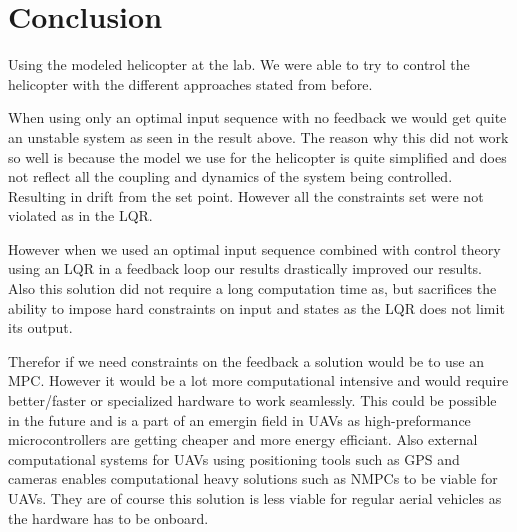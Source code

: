 \section{Conclusion}\label{sec:conclusion}

Using the modeled helicopter at the lab. We were able to try to control the helicopter with the different approaches stated from before.

When using only an optimal input sequence with no feedback we would get quite an unstable system as seen in the result above. The reason why this did not work so well is because the model we use for the helicopter is quite simplified and does not reflect all the coupling and dynamics of the system being controlled. Resulting in drift from the set point. However all the constraints set were not violated as in the LQR.

However when we used an optimal input sequence combined with control theory using an LQR in a feedback loop our results drastically improved our results. Also this solution did not require a long computation time as, but sacrifices the ability to impose hard constraints on input and states as the LQR does not limit its output.

Therefor if we need constraints on the feedback a solution would be to use an MPC. However it would be a lot more computational intensive and would require better/faster or specialized hardware to work seamlessly. This could be possible in the future and is a part of an emergin field in UAVs as high-preformance microcontrollers are getting cheaper and more energy efficiant. Also external computational systems for UAVs using positioning tools such as GPS and cameras enables computational heavy solutions such as NMPCs to be viable for UAVs. They are of course this solution is less viable for regular aerial vehicles as the hardware has to be onboard.
